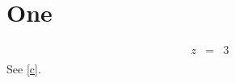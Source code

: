 \documentclass{article}
\begin{document}
\section{One}
\begin{eqnarray*}
z &=& 3 \\
  \label{c}
\end{eqnarray*}
See \ref{c}.
\end{document}
